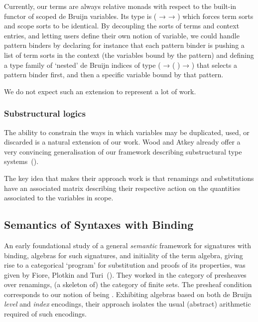 Currently, our terms are always relative monads with respect to the built-in
 functor of scoped de Bruijn variables. Its type is
{( →   → )} which forces term sorts and
scope sorts to be identical.
%
By decoupling the sorts of terms and context entries, and letting users
define their own notion of variable, we could handle pattern binders by
declaring for instance that each pattern binder is pushing a list of
term sorts in the context (the variables bound by the pattern) and
defining a type family of `nested' de Bruijn indices of type
{( →  ( ) → )} that selects a
pattern binder first, and then a specific variable bound by that pattern.

We do not expect such an extension to represent a lot of work.

\subsubsection{Substructural logics}

The ability to constrain the ways in which variables may be duplicated, used,
or discarded is a natural extension of our work.
%
Wood and Atkey already offer a very convincing generalisation of our framework
describing substructural type systems~(\citeyear{DBLP:conf/esop/WoodA22}).

The key idea that makes their approach work is that renamings and substitutions
have an associated matrix describing their respective action on the quantities
associated to the variables in scope.


\subsection{Semantics of Syntaxes with Binding} An early foundational study
of a general \emph{semantic} framework for signatures with binding, algebras
for such signatures, and initiality of the term algebra, giving rise to a
categorical `program' for substitution and proofs of its properties, was given
by Fiore, Plotkin and Turi~(\citeyear{FiorePlotkinTuri99}).
They worked in the category of presheaves
over renamings, (a skeleton of) the category of finite sets. The presheaf
condition corresponds to our notion of being . Exhibiting
algebras based on both de Bruijn \emph{level} and \emph{index} encodings,
their approach isolates the usual (abstract) arithmetic required of such
encodings.

